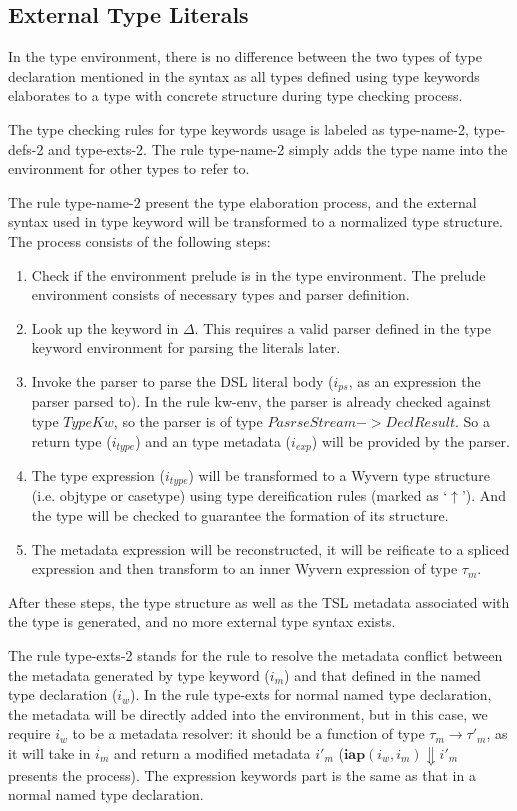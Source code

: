 \documentclass{sig-alternate}
\begin{document}

\subsection{External Type Literals}
In the type environment, there is no difference between the two types of type declaration mentioned in the syntax as all types defined using type keywords elaborates to a type with concrete structure during type checking process.

The type checking rules for type keywords usage is labeled as type-name-2, type-defs-2 and type-exts-2. The rule type-name-2 simply adds the type name into the environment for other types to refer to.

The rule type-name-2 present the type elaboration process, and the external syntax used in type keyword will be transformed to a normalized type structure. The process consists of the following steps:
\begin{enumerate}\setlength{\itemsep}{0pt}
\item Check if the environment prelude is in the type environment. The prelude environment consists of necessary types and parser definition. 
\item Look up the keyword in $\Delta$. This requires a valid parser defined in the type keyword environment for parsing the literals later.
\item Invoke the parser to parse the DSL literal body ($i_{ps}$, as an expression the parser parsed to). In the rule kw-env, the parser is already checked against type $TypeKw$, so the parser is of type $PasrseStream->DeclResult$. So a return type ($i_{type}$) and an type metadata ($i_{exp}$) will be provided by the parser.
\item The type expression ($i_{type}$) will be transformed to a Wyvern type structure (i.e. objtype or casetype) using type dereification rules (marked as `$\uparrow$'). And the type will be checked to guarantee the formation of its structure.
\item The metadata expression will be reconstructed, it will be reificate to a spliced expression and then transform to an inner Wyvern expression of type $\tau_m$. 
\end{enumerate} 
After these steps, the type structure as well as the TSL metadata associated with the type is generated, and no more external type syntax exists.

The rule type-exts-2 stands for the rule to resolve the metadata conflict between the metadata generated by type keyword ($i_m$) and that defined in the named type declaration ($i_w$). In the rule type-exts for normal named type declaration, the metadata will be directly added into the environment, but in this case, we require $i_w$ to be a metadata resolver: it should be a function of type $\tau_m\rightarrow\tau'_m$, as it will take in $i_m$ and return a modified metadata $i'_m$ ($\mathbf{iap}(i_w, i_m)\Downarrow i'_m$ presents the process). The expression keywords part is the same as that in a normal named type declaration.

\end{document}
